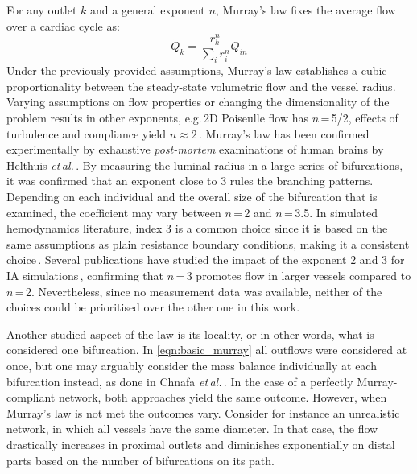For any outlet $k$ and a general exponent $n$, Murray's law fixes the average flow over a cardiac cycle as:
\begin{equation}
	\dot{Q}_{k} =\frac{r_k^n}{\sum_i r_i^n}\dot{Q}_{in}
	\label{eqn:basic_murray}
\end{equation}
Under the previously provided assumptions, Murray's law establishes a cubic proportionality between the steady-state volumetric flow and the vessel radius. Varying assumptions on flow properties or changing the dimensionality of the problem results in other exponents, e.g.\,2D Poiseulle flow has $n$\,=\,5/2, effects of turbulence and compliance yield $n \approx 2$\,\cite{Keelan2021}. Murray's law has been confirmed experimentally by exhaustive \textit{post-mortem} examinations of human brains by Helthuis \textit{et\,al.}\,\cite{Helthuis2019}. By measuring the luminal radius in a large series of bifurcations, it was confirmed that an exponent close to 3 rules the branching patterns. Depending on each individual and the overall size of the bifurcation that is examined, the coefficient may vary between $n$\,=\,2 and $n$\,=\,3.5. In simulated hemodynamics literature, index 3 is a common choice since it is based on the same assumptions as plain resistance boundary conditions, making it a consistent choice\,\cite{Marsden2008}. Several publications have studied the impact of the exponent 2 and 3 for IA simulations\,\cite{Saalfeld2019, Chnafa2018}, confirming that $n$\,=\,3 promotes flow in larger vessels compared to $n$\,=\,2. Nevertheless, since no measurement data was available, neither of the choices could be prioritised over the other one in this work.

Another studied aspect of the law is its locality, or in other words, what is considered one bifurcation. In \autoref{eqn:basic_murray} all outflows were considered at once, but one may arguably consider the mass balance individually at each bifurcation instead, as done in Chnafa \textit{et\,al.}\,\cite{Chnafa2018}. In the case of a perfectly Murray-compliant network, both approaches yield the same outcome. However, when Murray's law is not met the outcomes vary. Consider for instance an unrealistic network, in which all vessels have the same diameter. In that case, the flow drastically increases in proximal outlets and diminishes exponentially on distal parts based on the number of bifurcations on its path.

